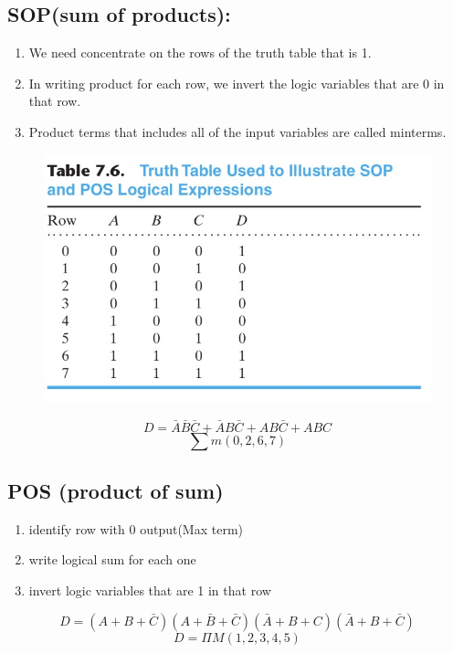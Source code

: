 \documentclass[a4paper,12]{article}
\begin{document}
     \subsection{SOP(sum of products):}
     \begin{enumerate}
         \item We need concentrate on the rows of the truth table that is 1.
         \item In writing product for each row, we invert the logic variables that are 0 in that row.
         \item Product terms that includes all of the input variables are called minterms.
     \end{enumerate}
     \begin{figure}[H]
         \centering
         \includegraphics[width=120mm]{Image/40.jpg}
     \end{figure}
     \[D=\bar{A}\bar{B}\bar{C}+\bar{A}B\bar{C}+AB\bar{C}+ABC\]
     \[\sum m(0,2,6,7)\]
     \subsection{POS (product of sum)}
     \begin{enumerate}
         \item identify row with 0 output(Max term)
         \item write logical sum for each one
         \item invert logic variables that are 1 in that row
     \end{enumerate}
     \[D=(A+B+\bar{C})(A+\bar{B}+\bar{C})(\bar{A}+B+C)(\bar{A}+B+\bar{C})\]
     \[D=\Pi M(1,2,3,4,5)\]
\end{document}
